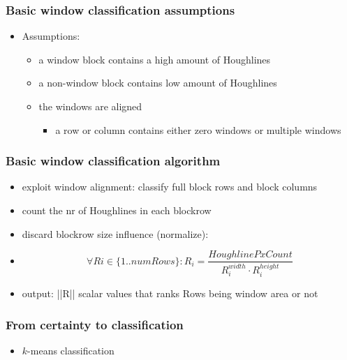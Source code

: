 \documentclass{beamer}
\begin{document}
\frame
{
	\frametitle{Basic window classification assumptions}
	\begin{itemize}
	\item Assumptions:
		\begin{itemize}
		\item a window block contains a high amount of Houghlines
		\item a non-window block contains low amount of Houghlines
		\item the windows are aligned 
			\begin{itemize}
			\item a row or column contains either zero windows or multiple windows 
			\end{itemize}
		\end{itemize}
	\end{itemize}
}

\frame
{
	\frametitle{Basic window classification algorithm}
	\begin{itemize}
	\item exploit window alignment: classify full block rows and block columns
	\item count the nr of Houghlines in each blockrow
	\item discard blockrow size influence (normalize):
	\item \[\forall Ri\in \{1..numRows\} : R_i = \frac{HoughlinePxCount}{R_i^{width} \cdot R_i^{height}}\]
	\item output: ||R|| scalar values that ranks Rows being window area or not
	\end{itemize}
	

}

\frame
{
}

\frame
{
}

\frame
{
}



\frame
{
	\frametitle{From certainty to classification}
	\begin{itemize}
	\item $k$-means classification

	\end{itemize}
}
\end{document}
